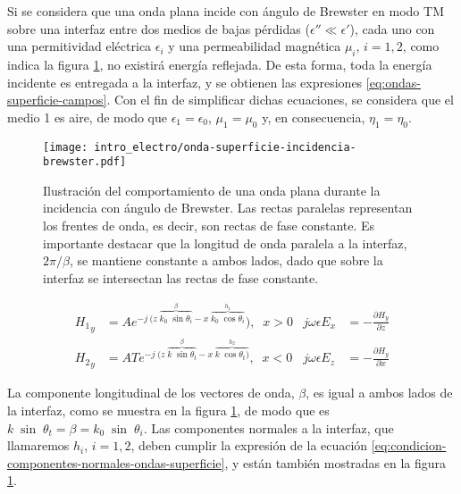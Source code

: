 Si se considera que una onda plana incide con ángulo de Brewster en modo TM sobre una interfaz entre dos medios de bajas pérdidas ($\epsilon'' \ll \epsilon'$), cada uno con una permitividad eléctrica $\epsilon_i$ y una permeabilidad magnética $\mu_i$, $i=1,2$, como indica la figura \ref{fig:onda-superficie-brewster}, no existirá energía reflejada. De esta forma, toda la energía incidente es entregada a la interfaz, y se obtienen las expresiones \ref{eq:ondas-superficie-campos}. Con el fin de simplificar dichas ecuaciones, se considera que el medio 1 es aire, de modo que $\epsilon_1 = \epsilon_0$, $\mu_1 = \mu_0$ y, en consecuencia, $\eta_1 = \eta_0$.

\begin{figure}[htp]
	\centering
	\texttt{[image: intro\_electro/onda-superficie-incidencia-brewster.pdf]}
	\caption{Ilustración del comportamiento de una onda plana durante la incidencia con ángulo de Brewster. Las rectas paralelas representan los frentes de onda, es decir, son rectas de fase constante. Es importante destacar que la longitud de onda paralela a la interfaz, $2\pi/\beta$, se mantiene constante a ambos lados, dado que sobre la interfaz se intersectan las rectas de fase constante.}
	\label{fig:onda-superficie-brewster}
\end{figure}

\begin{subequations}
	\label{eq:ondas-superficie-campos}
	\begin{align}
	{H_1}_y &= A e^{-j\ (z\; \overbrace{k_0\;\sin \theta_i}^{\beta} - x\; \overbrace{k_0\;\cos \theta_i}^{h_1}}),\;\; x>0 & j\omega\epsilon E_x &= -\frac{\partial H_y}{\partial z} \\
	{H_2}_y &= A T e^{-j\; (z\; \overbrace{k\; \sin \theta_t}^{\beta} - x\; \overbrace{k\; \cos \theta_t)}^{h_2}},\;\; x<0   & j\omega\epsilon E_z &= -\frac{\partial H_y}{\partial x} 
	\end{align}
\end{subequations}

La componente longitudinal de los vectores de onda, $\beta$, es igual a ambos lados de la interfaz, como se muestra en la figura \ref{fig:onda-superficie-brewster}, de modo que es $k \; \sin \; \theta_t = \beta = k_0 \; \sin \; \theta_i$. Las componentes normales a la interfaz, que llamaremos $h_i$, $i=1,2$, deben cumplir la expresión de la ecuación \ref{eq:condicion-componentes-normales-ondas-superficie}, y están también mostradas en la figura \ref{fig:onda-superficie-brewster}.

